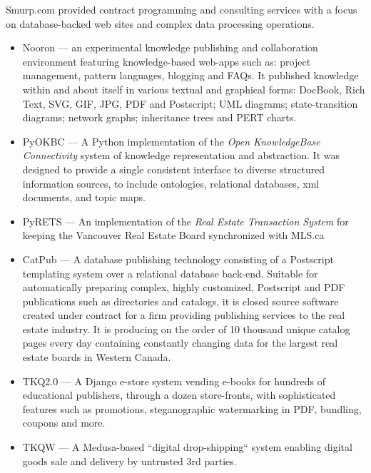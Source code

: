 \documentclass[line,margin]{res}
\begin{document}
\begin{resume}
\begin{position}
Smurp.com provided contract programming and consulting services with a focus
on database-backed web sites and complex data processing operations.

\begin{itemize}
  \item Nooron --- an experimental knowledge publishing and collaboration
    environment featuring knowledge-based web-apps such as:
    project management, pattern languages, blogging and FAQs.
    It published knowledge within and about itself in various textual 
    and graphical forms:
    DocBook, Rich Text, SVG, GIF, JPG, PDF and Postscript;
    UML diagrams; state-transition diagrams; network graphs; 
    inheritance trees and PERT charts.

  \item PyOKBC --- A Python implementation of the 
     \emph{Open KnowledgeBase Connectivity}
  system of knowledge representation and abstraction.
  It was designed to provide a single consistent interface to diverse structured
  information sources, to include ontologies, relational databases,
  xml documents, and topic maps. %

  \item PyRETS --- An implementation of the \emph{Real Estate Transaction System}
  for keeping the Vancouver Real Estate Board synchronized with MLS.ca

  \item CatPub --- A database publishing technology consisting of a
  Postscript templating system over a relational database back-end.
  Suitable for automatically preparing complex, highly customized,
  Postscript and PDF publications such as directories and catalogs,
  it is closed source software created under contract for a firm
  providing publishing services to the real estate industry.  
  It is producing on the order of 10 thousand unique catalog pages 
  every day containing constantly changing data for the largest 
  real estate boards in Western Canada.

  \item TKQ2.0 --- A Django e-store system vending e-books for hundreds
  of educational publishers, through a dozen store-fronts, with sophisticated 
  features such as promotions, steganographic watermarking in PDF, bundling,
  coupons and more.

  \item TKQW --- A Medusa-based ``digital drop-shipping`` system
  enabling digital goods sale and delivery by untrusted 3rd parties.


\end{itemize}
\end{position}
\end{resume}
\end{document}
